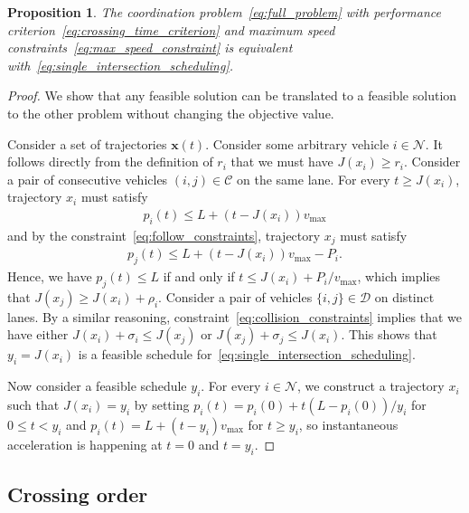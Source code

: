 \documentclass[a4paper]{article}
\theoremstyle{definition}
\theoremstyle{plain}
\newtheorem{proposition}{Proposition}
\begin{document}
\begin{proposition}
  The coordination problem~\eqref{eq:full_problem} with performance criterion~\eqref{eq:crossing_time_criterion} and maximum speed
  constraints~\eqref{eq:max_speed_constraint} is equivalent with~\eqref{eq:single_intersection_scheduling}.
\end{proposition}
\begin{proof}
  We show that any feasible solution can be translated to a feasible solution to
  the other problem without changing the objective value.

  Consider a set of trajectories $\mathbf{x}(t)$. Consider some arbitrary
  vehicle $i \in \mathcal{N}$. It follows directly from the definition of $r_{i}$
  that we must have $J(x_{i}) \geq r_{i}$.
  Consider a pair of consecutive vehicles $(i,j) \in \mathcal{C}$ on the same
  lane. For every $t \geq J(x_{i})$, trajectory $x_{i}$ must satisfy
  \begin{align*}
    p_{i}(t) \leq L + (t - J(x_{i})) v_{\text{max}}
  \end{align*}
  and by the constraint~\eqref{eq:follow_constraints}, trajectory $x_{j}$ must satisfy
  \begin{align*}
    p_{j}(t) \leq L + (t - J(x_{i})) v_{\text{max}} - P_{i} .
  \end{align*}
  Hence, we have $p_{j}(t) \leq L$ if and only if
  $t \leq J(x_{i}) + P_{i} / v_{\text{max}}$, which implies that
  $J(x_{j}) \geq J(x_{i}) + \rho_{i}$.
  Consider a pair of vehicles $\{i, j\} \in \mathcal{D}$ on distinct lanes. By a
  similar reasoning, constraint~\eqref{eq:collision_constraints} implies that we have either
  $J(x_{i}) + \sigma_{i} \leq J(x_{j})$ or $J(x_{j}) + \sigma_{j} \leq J(x_{i})$.
  This shows that $y_{i} = J(x_{i})$ is a feasible schedule for~\eqref{eq:single_intersection_scheduling}.

  Now consider a feasible schedule $y_{i}$. For every $i \in \mathcal{N}$, we
  construct a trajectory $x_{i}$ such that $J(x_{i}) = y_{i}$ by setting
  $p_{i}(t) = p_{i}(0) + t (L - p_{i}(0)) / y_{i}$ for $0 \leq t < y_{i}$ and
  $p_{i}(t) = L + (t - y_{i}) v_{\text{max}}$ for $t \geq y_{i}$, so
  instantaneous acceleration is happening at $t=0$ and $t=y_{i}$.
\end{proof}


\subsection*{Crossing order}
\end{document}
